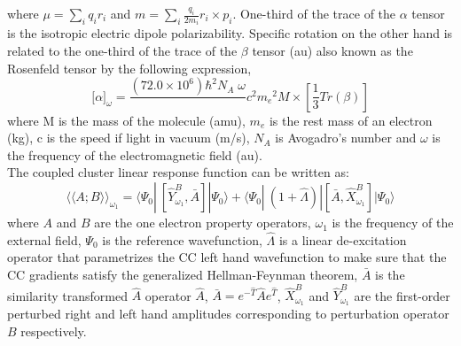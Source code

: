where $\mu = \sum_i q_i r_i $ and $m = \sum_i \frac{q_i}{2m_i} r_i \times p_i$. 
One-third of the trace of the $\alpha$ tensor is the isotropic 
electric dipole polarizability. Specific rotation on the other hand 
is related to the one-third of the trace of the $\beta$ tensor (au) 
also known as the Rosenfeld tensor by the following expression\cite{},
\begin{equation}
{\lbrack\alpha\rbrack}_{\omega} = \frac{(72.0 \times 10^6){\hbar}^2 N_A\;\omega}\
{c^2{m_e}^2 M} \times \left[ \frac{1}{3}Tr(\beta)\right]
\end{equation}
where M is the mass of the molecule (amu), $m_e$ is the rest mass of an electron
(kg), c is the speed if light in vacuum (m/s), $N_A$ is Avogadro's number and $\omega$
is the frequency of the electromagnetic field (au). \\
The coupled cluster linear response function can be written as\cite{}: 
\begin{equation}
{\langle\langle A;B\rangle\rangle}_{\omega_1} =  \langle \Psi_0 | \
[\hat{Y}^{B}_{\omega_1}, \bar{A}]|\Psi_0\rangle + \langle \Psi_0 | \
(1 + \hat{\Lambda})|[\bar{A},\hat{X}^{B}_{\omega_1}]|\Psi_0\rangle 
\end{equation}
where $A$ and $B$ are the one electron property operators,
$\omega_1$ is the frequency of the external field, 
$\Psi_0$ is the reference wavefunction, $\hat{\Lambda}$ is 
a linear de-excitation operator that parametrizes the CC left hand 
wavefunction to make sure that the CC gradients satisfy the 
generalized Hellman-Feynman theorem\cite{}, $\bar{A}$ is the 
similarity transformed $\hat{A}$ operator $\hat{A}$, $\bar{A} = e^{-\hat{T}}\hat{A}e^{\hat{T}}$,
$\hat{X}^{B}_{\omega_1}$ and $\hat{Y}^{B}_{\omega_1}$ are the first-order 
perturbed right and left hand amplitudes corresponding to perturbation operator 
$B$ respectively. 
